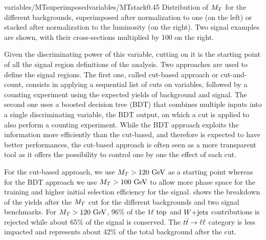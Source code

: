                      {variables/MTsuperimposed}{variables/MTstack}{0.45}
                     {Distribution of $M_T$ for the different backgrounds, superimposed
                     after normalization to one (on the left) or stacked after normalization
                     to the luminosity (on the right). Two signal examples are shown, with
                     their cross-sections multiplied by 100 on the right.}

    Given the discriminating power of this variable, cutting on it is the starting point
    of all the signal region definitions of the analysis. Two approaches are used to define
    the signal regions. The first one, called cut-based approach or cut-and-count, consists
    in applying a sequential list of cuts on variables, followed by a counting experiment
    using the expected yields of background and signal. The second one uses a boosted
    decision tree (BDT) that combines multiple inputs into a single discriminating variable, the
    BDT output, on which a cut is applied to also perform a counting experiment. While the
    BDT approach exploits the information more efficiently than the cut-based, and therefore is
    expected to have better performances, the cut-based approach is often seen as a more
    transparent tool as it offers the possibility to control one by one the effect of each
    cut.

    For the cut-based approach, we use $M_T > 120 ~\text{GeV}$ as a starting point
    whereas for the BDT approach we use $M_T > 100 ~\text{GeV}$ to allow more phase space for the
    training and higher initial selection efficiency for the signal. 
    shows the breakdown of the yields after the $M_T$ cut for the different backgrounds and two signal benchmarks.
    For $M_T > 120~\text{GeV}$, 96\% of the $1\ell~\text{top}$ and $\text{$W$+jets}$ contributions is rejected
    while about 65\% of the signal is conserved. The $t\bar{t} \rightarrow \ell \ell$ category is less
    impacted and represents about 42\% of the total background after the cut.

